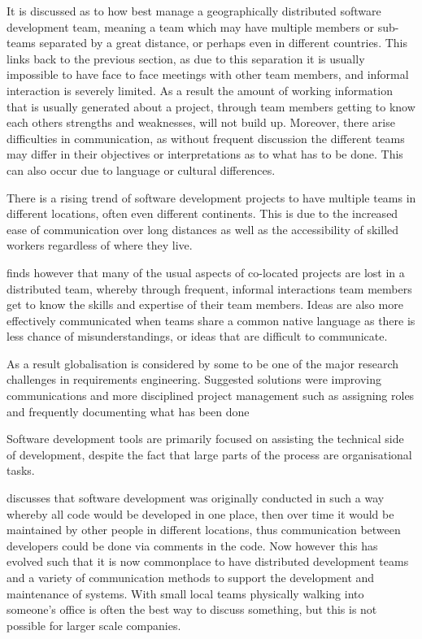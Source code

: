\documentclass{l4proj}
\begin{document}
It is discussed as to how best manage a geographically distributed software development team, meaning a team which may have multiple members or sub-teams separated by a great distance, or perhaps even in different countries.  This links back to the previous section, as due to this separation it is usually impossible to have face to face meetings with other team members, and informal interaction is severely limited.   As a result the amount of working information that is usually generated about a project, through team members getting to know each others strengths and weaknesses, will not build up.  Moreover, there arise difficulties in communication, as without frequent discussion the different teams may differ in their objectives or interpretations as to what has to be done.  This can also occur due to language or cultural differences.


There is a rising trend of software development projects to have multiple teams in different locations, often even different continents.  This is due to the increased ease of communication over long distances as well as the accessibility of skilled workers regardless of where they live.

\citet{herbsleb07global} finds however that many of the usual aspects of co-located projects are lost in a distributed team, whereby through frequent, informal interactions team members get to know the skills and expertise of their team members.  Ideas are also more effectively communicated when teams share a common native language as there is less chance of misunderstandings, or ideas that are difficult to communicate.

As a result globalisation is considered by some to be one of the major research challenges in requirements engineering.  Suggested solutions were improving communications and more disciplined project management such as assigning roles and frequently documenting what has been done

Software development tools are primarily focused on assisting the technical side of development, despite the fact that large parts of the process are organisational tasks.

\citet{halverson06designing} discusses that software development was originally conducted in such a way whereby all code would be developed in one place, then over time it would be maintained by other people in different locations, thus communication between developers could be done via comments in the code.  Now however this has evolved such that it is now commonplace to have distributed development teams and a variety of communication methods to support the development and maintenance of systems.  With small local teams physically walking into someone's office is often the best way to discuss something, but this is not possible for larger scale companies.
\end{document}
